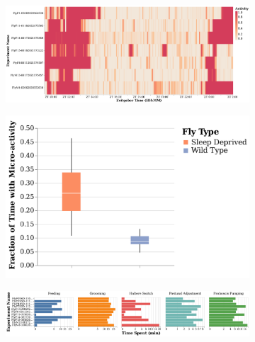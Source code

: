 \begin{figure}[ht!]
	\centering
	\begin{subfigure}[b]{0.70\linewidth}
		\centering\includegraphics[width=\linewidth]{figures/ActivityBinned-Ann-WT-5T.pdf}
		\caption{}
	\end{subfigure}%
	\centering
	\begin{subfigure}[b]{0.30\linewidth}
		\centering
		\includegraphics[width=\linewidth]{figures/FractionTime-Microactivity.pdf}
		\caption{\label{figure:fraction-of-time-with-microactivity}}
	\end{subfigure}%

	\centering
	\begin{subfigure}[ht!]{0.80\linewidth}
		\centering
		\includegraphics[width=\linewidth]{figures/TimeSpent-perBehavior-Ann.pdf}
		\caption{}
	\end{subfigure}%
\end{figure}

